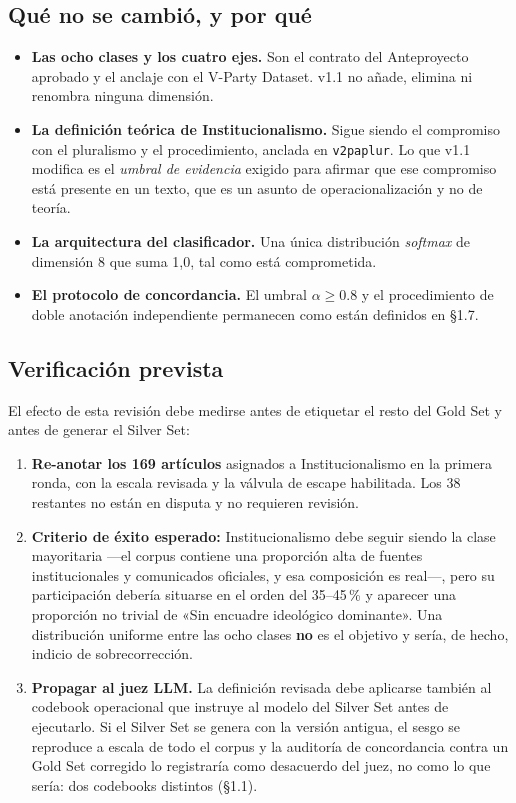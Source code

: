 \documentclass[11pt,letterpaper]{article}
\begin{document}
\subsection{Qué no se cambió, y por qué}
\begin{itemize}
\item \textbf{Las ocho clases y los cuatro ejes.} Son el contrato del Anteproyecto aprobado y el anclaje con
el V-Party Dataset. v1.1 no añade, elimina ni renombra ninguna dimensión.
\item \textbf{La definición teórica de Institucionalismo.} Sigue siendo el compromiso con el pluralismo y el
procedimiento, anclada en \texttt{v2paplur}. Lo que v1.1 modifica es el \emph{umbral de evidencia} exigido
para afirmar que ese compromiso está presente en un texto, que es un asunto de operacionalización y no de
teoría.
\item \textbf{La arquitectura del clasificador.} Una única distribución \emph{softmax} de dimensión 8 que
suma 1,0, tal como está comprometida.
\item \textbf{El protocolo de concordancia.} El umbral $\alpha \geq 0.8$ y el procedimiento de doble
anotación independiente permanecen como están definidos en §1.7.
\end{itemize}

\subsection{Verificación prevista}
El efecto de esta revisión debe medirse antes de etiquetar el resto del Gold Set y antes de generar el Silver
Set:

\begin{enumerate}
\item \textbf{Re-anotar los 169 artículos} asignados a Institucionalismo en la primera ronda, con la escala
revisada y la válvula de escape habilitada. Los 38 restantes no están en disputa y no requieren revisión.
\item \textbf{Criterio de éxito esperado:} Institucionalismo debe seguir siendo la clase mayoritaria —el
corpus contiene una proporción alta de fuentes institucionales y comunicados oficiales, y esa composición es
real—, pero su participación debería situarse en el orden del 35–45\,\% y aparecer una proporción no trivial
de «Sin encuadre ideológico dominante». Una distribución uniforme entre las ocho clases \textbf{no} es el
objetivo y sería, de hecho, indicio de sobrecorrección.
\item \textbf{Propagar al juez LLM.} La definición revisada debe aplicarse también al codebook operacional
que instruye al modelo del Silver Set antes de ejecutarlo. Si el Silver Set se genera con la versión antigua, el
sesgo se reproduce a escala de todo el corpus y la auditoría de concordancia contra un Gold Set corregido lo
registraría como desacuerdo del juez, no como lo que sería: dos codebooks distintos (§1.1).
\end{enumerate}
\end{document}
